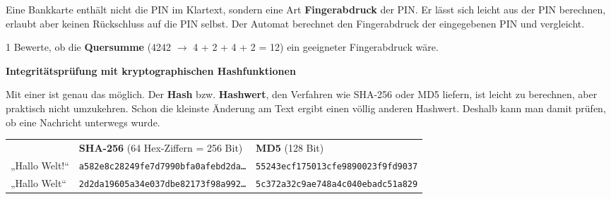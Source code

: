 \documentclass[11pt,a4paper]{article}
\begin{document}

\begin{minipage}[t]{0.66\linewidth}
\vspace{0pt}
Eine Bankkarte enthält nicht die PIN im Klartext, sondern eine Art \textbf{Fingerabdruck} der PIN. Er lässt sich leicht aus der PIN berechnen, erlaubt aber keinen Rückschluss auf die PIN selbst. Der Automat berechnet den Fingerabdruck der eingegebenen PIN und vergleicht.
\end{minipage}\hfill
\begin{minipage}[t]{0.3\linewidth}
\vspace{0pt}\centering
{}
\end{minipage}

\begin{aufgabe}{1}
Bewerte, ob die \textbf{Quersumme} (4242 $\to$ 4 + 2 + 4 + 2 = 12) ein geeigneter Fingerabdruck wäre.
\end{aufgabe}

\textbf{Integritätsprüfung mit kryptographischen Hashfunktionen}\par
{\lueckentext Mit einer  ist genau das möglich. Der \textbf{Hash} bzw. \textbf{Hashwert}, den Verfahren wie SHA-256 oder MD5 liefern, ist leicht zu berechnen, aber praktisch nicht umzukehren. Schon die kleinste Änderung am Text ergibt einen völlig anderen Hashwert. Deshalb kann man damit prüfen, ob eine Nachricht unterwegs  wurde.\par}
\vspace{1mm}
{\small\renewcommand{\arraystretch}{1.15}\setlength{\tabcolsep}{4pt}
\begin{tabular}{@{}l l l@{}}
& \textbf{SHA-256} (64 Hex-Ziffern = 256 Bit) & \textbf{MD5} (128 Bit)\\
„Hallo Welt!“ & \texttt{a582e8c28249fe7d7990bfa0afebd2da\ldots} & \texttt{55243ecf175013cfe9890023f9fd9037}\\
„Hallo Welt“ & \texttt{2d2da19605a34e037dbe82173f98a992\ldots} & \texttt{5c372a32c9ae748a4c040ebadc51a829}\\
\end{tabular}}
\end{document}

